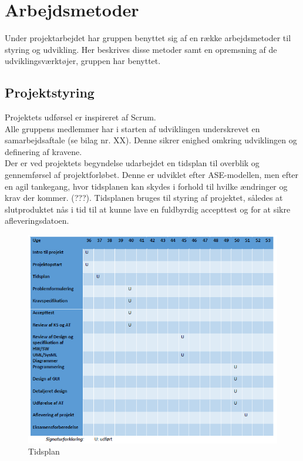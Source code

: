 \chapter{Arbejdsmetoder}\label{kapitel_Arbejdsmetoder}
Under projektarbejdet har gruppen benyttet sig af en række arbejdsmetoder til styring og udvikling.
Her beskrives disse metoder samt en opremsning af de udviklingsværktøjer, gruppen har benyttet.

\section{Projektstyring}
Projektets udførsel er inspireret af Scrum.\\
\newline
Alle gruppens medlemmer har i starten af udviklingen underskrevet en samarbejdsaftale (se bilag nr. XX). Denne sikrer enighed omkring udviklingen og definering af kravene. \\
\newline
Der er ved projektets begyndelse udarbejdet en tidsplan til overblik og gennemførsel af projektforløbet. Denne er udviklet efter ASE-modellen, men efter en agil tankegang, hvor tidsplanen kan skydes i forhold til hvilke ændringer og krav der kommer. (???). Tidsplanen bruges til styring af projektet, således at slutproduktet nås i tid til at kunne lave en fuldbyrdig accepttest og for at sikre afleveringsdatoen. \\

\begin{figure}[H]
\centering
\includegraphics[scale=0.70]{tidsplan.PNG}
\caption{Tidsplan}
\end{figure}

